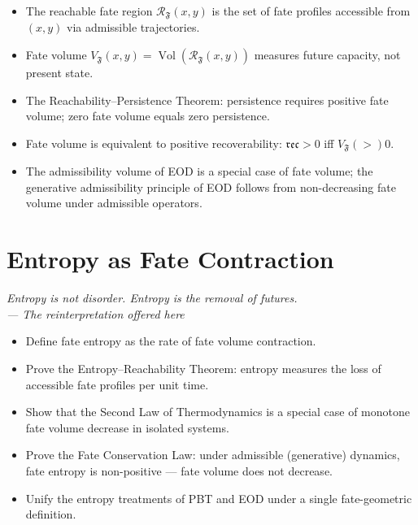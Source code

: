 \documentclass[12pt,twoside,openright]{book}
\newcommand{\reco}{\mathfrak{rec}}        %
\newcommand{\Vol}{\operatorname{Vol}}     %
\newcommand{\fateMap}{\mathfrak{F}}
\newenvironment{epigraph}[2]{%
  \vspace{1em}\begin{flushright}
  \begin{minipage}{0.72\textwidth}
  \itshape\small #1\\[0.4em]
  \upshape\footnotesize\sffamily\color{DistGray}--- #2
  \end{minipage}\end{flushright}\vspace{1.5em}}{}
\newenvironment{objectives}{%
  \begin{tcolorbox}[colback=DistBlue!5,colframe=DistBlue,
    title={\faCheckCircle\enspace Chapter Objectives},
    fonttitle=\sffamily\bfseries\color{white},
    attach boxed title to top left={yshift=-2mm,xshift=4mm},
    boxed title style={colback=DistBlue},breakable]
  \begin{itemize}[leftmargin=*,nosep]}{%
  \end{itemize}\end{tcolorbox}\vspace{1em}}
\newenvironment{chapsummary}{%
  \begin{tcolorbox}[colback=DistBlue!5,colframe=DistBlue,
    title={\faBookOpen\enspace Summary},
    fonttitle=\sffamily\bfseries\color{white},
    attach boxed title to top left={yshift=-2mm,xshift=4mm},
    boxed title style={colback=DistBlue,rounded corners}]
  \begin{itemize}[nosep,leftmargin=*]}{%
  \end{itemize}\end{tcolorbox}}
\providecommand{\fateReach}[1]{\mathcal{R}_{\fateMap}(#1)}
\providecommand{\fateVol}[1]{V_{\fateMap}(#1)}
\begin{document}
\begin{chapsummary}
\item The reachable fate region $\fateReach{x,y}$ is the set of
  fate profiles accessible from $(x,y)$ via admissible
  trajectories.
\item Fate volume $\fateVol{x,y}=\Vol(\fateReach{x,y})$ measures
  future capacity, not present state.
\item The Reachability--Persistence Theorem: persistence requires
  positive fate volume; zero fate volume equals zero persistence.
\item Fate volume is equivalent to positive recoverability:
  $\reco>0$ iff $\fateVol>0$.
\item The admissibility volume of EOD is a special case of
  fate volume; the generative admissibility principle of EOD
  follows from non-decreasing fate volume under admissible
  operators.
\end{chapsummary}


\chapter{Entropy as Fate Contraction}
\label{ch:fate-entropy}

\begin{epigraph}{Entropy is not disorder. Entropy is the removal
  of futures.}{The reinterpretation offered here}
\end{epigraph}

\begin{objectives}
\item Define fate entropy as the rate of fate volume contraction.
\item Prove the Entropy--Reachability Theorem: entropy measures
  the loss of accessible fate profiles per unit time.
\item Show that the Second Law of Thermodynamics is a special
  case of monotone fate volume decrease in isolated systems.
\item Prove the Fate Conservation Law: under admissible
  (generative) dynamics, fate entropy is non-positive ---
  fate volume does not decrease.
\item Unify the entropy treatments of PBT and EOD under a
  single fate-geometric definition.
\end{objectives}
\end{document}
